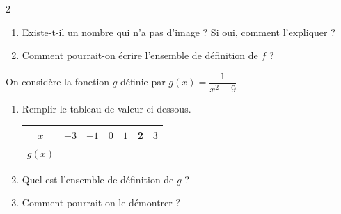 \documentclass[10pt,a4paper]{article}
\begin{document}
\begin{multicols}{2}
\begin{exo}[][appro]
\begin{enumerate}
        \renewcommand{\arraystretch}{2}
    \begin{tabular}{|*{6}{c|}}
        \hline
        \(x\) & \(-1\) & \(0\) & \(1\) &  \(3\) & \(7\)  \\
        \hline
        \(f(x)\) & & & & &  \\
        \hline
    \end{tabular}

    \item Existe-t-il un nombre qui n'a pas d'image ? Si oui, comment l'expliquer ?
    \item Comment pourrait-on écrire l'ensemble de définition de \(f\) ?
    \end{enumerate}

\end{exo}

\begin{exo}[][avance]
    On considère la fonction \(g\) définie par \(g(x) = \dfrac{1}{x^2-9}\)
    \begin{enumerate}
        \item Remplir le tableau de valeur ci-dessous.
    
        \renewcommand{\arraystretch}{2}
    \begin{tabular}{|*{7}{c|}}
        \hline
        \(x\) & \(-3\) & \(-1\) & \(0\) & \(1\) & 2 & \(3\)  \\
        \hline
        \(g(x)\) & & & & & & \\
        \hline
    \end{tabular}

    \item Quel est l'ensemble de définition de \(g\) ?
    \item Comment pourrait-on le démontrer ?
    \end{enumerate}
\end{exo}

\end{multicols}
\end{document}
